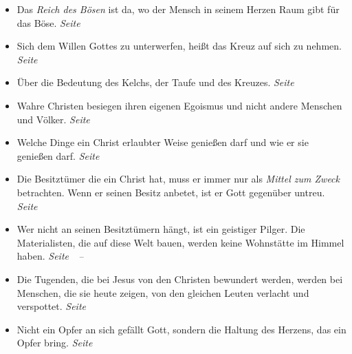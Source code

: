 \begin{itemize}
 \item Das \textit{Reich des Bösen} ist da, wo der Mensch in seinem Herzen Raum
gibt für das Böse.
 \dotfill \textit{Seite~\pageref{ref:03_04_reich_des_boesen}}\\

 \item Sich dem Willen Gottes zu unterwerfen, heißt das Kreuz auf sich zu
nehmen.
 \dotfill \textit{Seite~\pageref{ref:03_05_kreuz_auf_sich_nehmen}}\\

 \item Über die Bedeutung des Kelchs, der Taufe und des Kreuzes.
 \dotfill \textit{Seite~\pageref{ref:04_04_kelch_taufe_kreuz}}\\

 \item Wahre Christen besiegen ihren eigenen Egoismus und nicht andere Menschen
und Völker.
 \dotfill \textit{Seite~\pageref{ref:04_05_besigen}}\\

 \item Welche Dinge ein Christ erlaubter Weise genießen darf und wie er sie
genießen darf.
 \dotfill \textit{Seite~\pageref{ref:04_07_vorteile}}\\

 \item Die Besitztümer die ein Christ hat, muss er immer nur als \textit{Mittel
zum Zweck} betrachten. Wenn er seinen Besitz anbetet, ist er Gott gegenüber
untreu.
 \dotfill \textit{Seite~\pageref{ref:04_07_vorteile}}\\

 \item Wer nicht an seinen Besitztümern hängt, ist ein geistiger Pilger. Die
Materialisten, die auf diese Welt bauen, werden keine Wohnstätte im Himmel
haben.
 \dotfill
 \textit{Seite~\pageref{ref:04_10_pilger}~--~\pageref{ref:04_10_pilger_ende}}\\

 \item Die Tugenden, die bei Jesus von den Christen bewundert werden, werden bei
Menschen, die sie heute zeigen, von den gleichen Leuten verlacht und verspottet.
 \dotfill \textit{Seite~\pageref{ref:04_10_pilger}}\\

 \item Nicht ein Opfer an sich gefällt Gott, sondern die Haltung des Herzens, das
ein Opfer bring.
 \dotfill \textit{Seite~\pageref{ref:04_13_opfer}}\\


\end{itemize}

